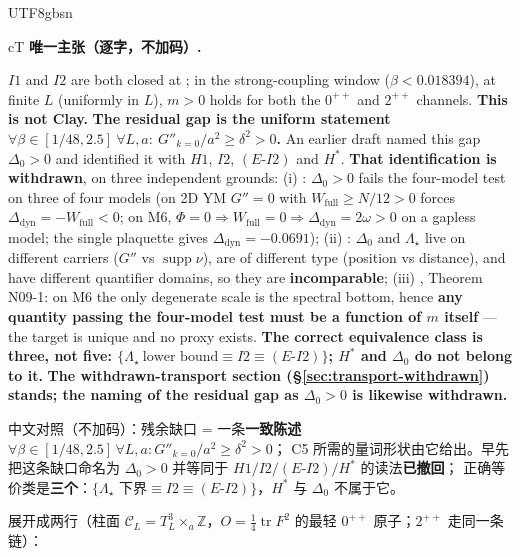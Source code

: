 \documentclass[11pt,a4paper]{article}
\newcommand{\labb}[2]{\fcolorbox{#1!35}{#1!8}{\textcolor{#1}{\textbf{\scriptsize #2}}}}
\newcommand{\LT}{\labb{cT}{T}}
\newcommand{\code}[1]{\texttt{\footnotesize\detokenize{#1}}}
\begin{document}
\begin{CJK}{UTF8}{gbsn}
\begin{claimbox}{cT}
\textbf{唯一主张（逐字，不加码）.}\hspace{0.35em}\LT
\par\smallskip
$I1$ and $I2$ are both closed at \code{[T]}; in the strong-coupling window ($\beta<0.018394$), at finite $L$ (uniformly in $L$),
$m>0$ holds for both the $0^{++}$ and $2^{++}$ channels. \textbf{This is not Clay.}
\textbf{The residual gap is the uniform statement $\forall\beta\in[1/48,2.5]\ \forall L,a:\ G''_{k=0}/a^2\ge\delta^2>0$.} An earlier draft named this gap $\Delta_0>0$ and identified it with $H1$, $I2$, $(E\text{-}I2)$ and $H^*$. \textbf{That identification is withdrawn}, on three independent grounds: (i) \code{n12}: $\Delta_0>0$ fails the four-model test on three of four models (on 2D YM $G''=0$ with $W_{\mathrm{full}}\ge N/12>0$ forces $\Delta_{\mathrm{dyn}}=-W_{\mathrm{full}}<0$; on M6, $\Phi=0\Rightarrow W_{\mathrm{full}}=0\Rightarrow\Delta_{\mathrm{dyn}}=2\omega>0$ on a gapless model; the single plaquette gives $\Delta_{\mathrm{dyn}}=-0.0691$); (ii) \code{n06}: $\Delta_0$ and $\Lambda_\star$ live on different carriers ($G''$ vs $\operatorname{supp}\nu$), are of different type (position vs distance), and have different quantifier domains, so they are \textbf{incomparable}; (iii) \code{n09}, Theorem N09-1: on M6 the only degenerate scale is the spectral bottom, hence \textbf{any quantity passing the four-model test must be a function of $m$ itself} --- the target is unique and no proxy exists. \textbf{The correct equivalence class is three, not five: $\{\Lambda_\star\ \text{lower bound}\equiv I2\equiv(E\text{-}I2)\}$; $H^*$ and $\Delta_0$ do not belong to it.}
\textbf{The withdrawn-transport section (\S\ref{sec:transport-withdrawn}) stands; the naming of the residual gap as $\Delta_0>0$ is likewise withdrawn.}
\par\smallskip
{\footnotesize 中文对照（不加码）：残余缺口 = 一条\textbf{一致陈述} $\forall\beta\in[1/48,2.5]\,\forall L,a:G''_{k=0}/a^2\ge\delta^2>0$；
C5 所需的量词形状由它给出。早先把这条缺口命名为 $\Delta_0>0$ 并等同于 $H1/I2/(E\text{-}I2)/H^*$ 的读法\textbf{已撤回}；
正确等价类是\textbf{三个}：$\{\Lambda_\star\text{ 下界}\equiv I2\equiv(E\text{-}I2)\}$，$H^*$ 与 $\Delta_0$ 不属于它。}
\par\smallskip
展开成两行（柱面 $\mathcal{C}_L=T^3_L\times_a\mathbb{Z}$，$O=\tfrac14\operatorname{tr}F^2$ 的最轻 $0^{++}$ 原子；$2^{++}$ 走同一条链）：

\end{claimbox}
\end{CJK}
\end{document}

